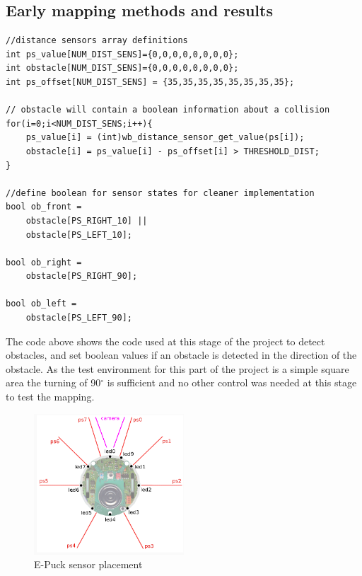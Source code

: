\subsection{Early mapping methods and results}

\begin{lstlisting}[caption={Proximity sensor reading}]
//distance sensors array definitions
int ps_value[NUM_DIST_SENS]={0,0,0,0,0,0,0,0};
int obstacle[NUM_DIST_SENS]={0,0,0,0,0,0,0,0};
int ps_offset[NUM_DIST_SENS] = {35,35,35,35,35,35,35,35};

// obstacle will contain a boolean information about a collision
for(i=0;i<NUM_DIST_SENS;i++){
    ps_value[i] = (int)wb_distance_sensor_get_value(ps[i]);
    obstacle[i] = ps_value[i] - ps_offset[i] > THRESHOLD_DIST;
}

//define boolean for sensor states for cleaner implementation
bool ob_front =
    obstacle[PS_RIGHT_10] ||
    obstacle[PS_LEFT_10];

bool ob_right =
    obstacle[PS_RIGHT_90];

bool ob_left =
    obstacle[PS_LEFT_90];
\end{lstlisting}

The code above shows the code used at this stage of the project to detect obstacles, and set boolean values if an obstacle is detected in the direction of the  obstacle. As the test environment for this part of the project is a simple square area the turning of 90$^{\circ}$ is sufficient and no other control was needed at this stage to test the mapping.

\begin{figure}[h]
\centering
\includegraphics[width = 0.5\textwidth]{../../figures/e_puck_sensor_placement.png}
\caption[E-Puck sensor placement]{E-Puck sensor placement\footnotemark}
\label{sensor_placement}
\end{figure}

